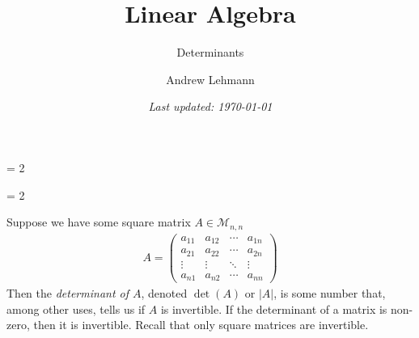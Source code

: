 \documentclass[usenames,dvipsnames,aspectratio=169,10pt]{beamer}
\def \SCHOOLVERSION {1} %
\numberwithin{equation}{section}
\begin{document}
\title{Linear Algebra}
\subtitle{Determinants}
\author{Andrew Lehmann}
\ifnum \SCHOOLVERSION = 2
\fi
\date{\textit{Last updated: \today}}

\ifnum \SCHOOLVERSION = 2
\fi


\begin{frame}
\titlepage
\end{frame}




\begin{frame}

Suppose we have some square matrix $A\in \mathcal{M}_{n,n}$
\begin{align*}
A =
\begin{pmatrix}
a_{11} & a_{12} & \cdots & a_{1n} \\
a_{21} & a_{22} & \cdots & a_{2n} \\
\vdots & \vdots & \ddots & \vdots \\
a_{n1} & a_{n2} & \cdots & a_{nn}
\end{pmatrix}
\end{align*}
Then the \textit{determinant of $A$}, denoted $\det(A)$ or $|A|$, is some number that, among other uses, tells us if $A$ is invertible. If the determinant of a matrix is non-zero, then it is invertible. Recall that only square matrices are invertible.

\end{frame}
\end{document}
